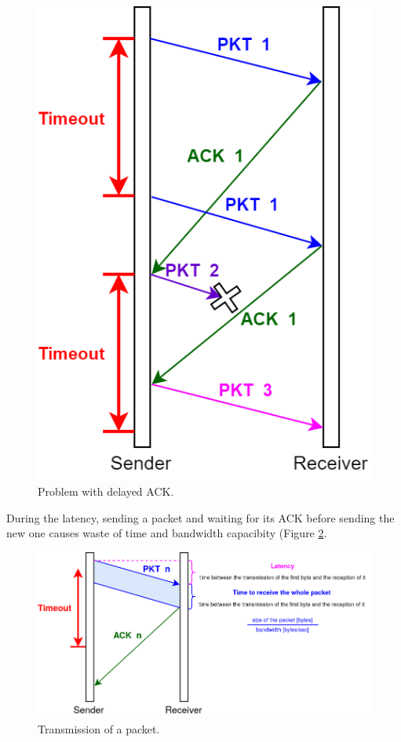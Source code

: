 \begin{figure}[H]
\centering\footnotesize
\includegraphics[scale=0.4]{Images/Transport/delay_ACK}
\caption{Problem with delayed ACK.}\label{delay_ACK}
\end{figure}

During the latency, sending a packet and waiting for its ACK before sending the new one causes waste of time and bandwidth capacibity (Figure \ref{waste_time}.\\

\begin{figure}[H]
\centering\footnotesize
\includegraphics[scale=0.4]{Images/Transport/waste_time}
\caption{Transmission of a packet.}\label{waste_time}
\end{figure}

